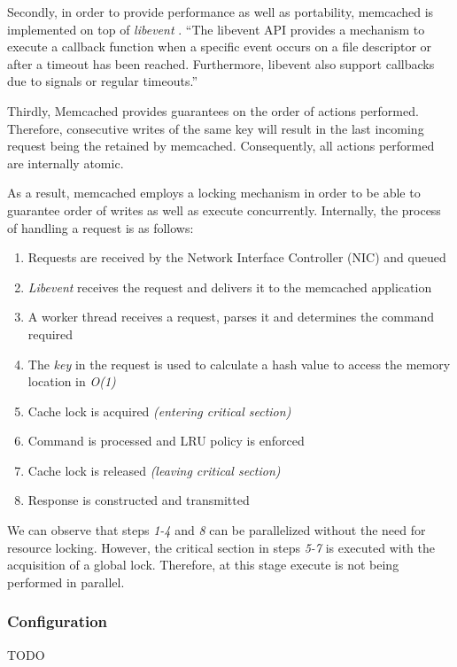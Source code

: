 Secondly, in order to provide performance as well as  portability, memcached is implemented on top of \textit{libevent} \cite{libevent}. ``The libevent API provides a mechanism to execute a callback function when a specific event occurs on a file descriptor or after a timeout has been reached. Furthermore, libevent also support callbacks due to signals or regular timeouts.'' \cite{libevent}

Thirdly, Memcached provides guarantees on the order of actions performed. Therefore, consecutive writes of the same key will result in the last incoming request being the retained by memcached. Consequently, all actions performed are internally atomic.

As a result, memcached employs a locking mechanism in order to be able to guarantee order of writes as well as execute concurrently. Internally, the process of handling a request is as follows:

\begin{enumerate}
    \item Requests are received by the Network Interface Controller (NIC) and queued
    \item \emph{Libevent} receives the request and delivers it to the memcached application
    \item A worker thread receives a request, parses it and determines the command required
    \item The \emph{key} in the request is used to calculate a hash value to access the memory location in \emph{O(1)}
    \item Cache lock is acquired \emph{(entering critical section)}
    \item Command is processed and LRU policy is enforced
    \item Cache lock is released \emph{(leaving critical section)}
    \item Response is constructed and transmitted \cite{wiggins2012enhancing}
\end{enumerate}

We can observe that steps \textit{1-4} and \textit{8} can be parallelized without the need for resource locking. However, the critical section in steps \textit{5-7} is executed with the acquisition of a global lock. Therefore, at this stage execute is not being performed in parallel.

\subsubsection{Configuration}
\label{sec:memcached_configuration}
TODO

